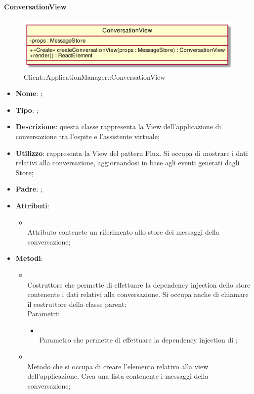 \hypertarget{ConversationView_label}{\paragraph{ConversationView}}
\begin{figure}[h]
	\centering
	\includegraphics[width=\textwidth,height=\textheight,keepaspectratio]{images/ClassConversationView.png}
	\caption{Client::ApplicationManager::ConversationView}
\end{figure}
\begin{itemize}
	\item \textbf{Nome}: ;
	\item \textbf{Tipo}: ;
	\item \textbf{Descrizione}: questa classe rappresenta la View dell'applicazione di conversazione tra l'ospite e l'assistente virtuale;
	\item \textbf{Utilizzo}: rappresenta la View del pattern Flux. Si occupa di mostrare i dati relativi alla conversazione, aggiornandosi in base agli eventi generati dagli Store;
	\item \textbf{Padre}: ;
	\item \textbf{Attributi}:
	\begin{itemize}
		\item[]  \\
		Attributo contenete un riferimento allo store dei messaggi della conversazione;
	\end{itemize}
	\item \textbf{Metodi}:
	\begin{itemize}
		\item[]  \\
		Costruttore che permette di effettuare la dependency injection dello store contenente i dati relativi alla conversazione. Si occupa anche di chiamare il costruttore della classe parent;\\
		Parametri:
		\begin{itemize}
			\item {} \\
			Parametro che permette di effettuare la dependency injection di ;
		\end{itemize}
		\item[]  \\
		Metodo che si occupa di creare l'elemento relativo alla view dell'applicazione. Crea una lista contenente i messaggi della conversazione;\\
	\end{itemize}
\end{itemize}
\FloatBarrier

